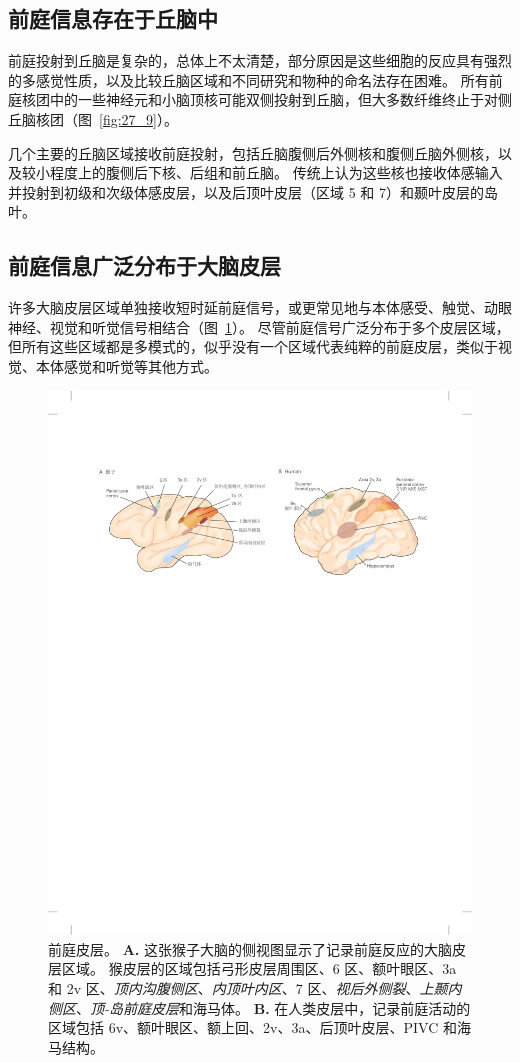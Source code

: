 \subsection{前庭信息存在于丘脑中}

前庭投射到丘脑是复杂的，总体上不太清楚，部分原因是这些细胞的反应具有强烈的多感觉性质，以及比较丘脑区域和不同研究和物种的命名法存在困难。
所有前庭核团中的一些神经元和小脑顶核可能双侧投射到丘脑，但大多数纤维终止于对侧丘脑核团（图~\ref{fig:27_9}）。


几个主要的丘脑区域接收前庭投射，包括丘脑腹侧后外侧核和腹侧丘脑外侧核，以及较小程度上的腹侧后下核、后组和前丘脑。
传统上认为这些核也接收体感输入并投射到初级和次级体感皮层，以及后顶叶皮层（区域 5 和 7）和颞叶皮层的岛叶。



\subsection{前庭信息广泛分布于大脑皮层}

许多大脑皮层区域单独接收短时延前庭信号，或更常见地与本体感受、触觉、动眼神经、视觉和听觉信号相结合（图~\ref{fig:27_14}）。 
尽管前庭信号广泛分布于多个皮层区域，但所有这些区域都是多模式的，似乎没有一个区域代表纯粹的前庭皮层，类似于视觉、本体感觉和听觉等其他方式。


\begin{figure}[htbp]
	\centering
	\includegraphics[width=0.9\linewidth]{chap27/fig_27_14}
	\caption{前庭皮层。
		\textbf{A.} 这张猴子大脑的侧视图显示了记录前庭反应的大脑皮层区域。
		猴皮层的区域包括弓形皮层周围区、6 区、额叶眼区、3a 和 2v 区、\textit{顶内沟腹侧区}、\textit{内顶叶内区}、7 区、\textit{视后外侧裂}、\textit{上颞内侧区}、\textit{顶-岛前庭皮层}和海马体。
		\textbf{B.} 在人类皮层中，记录前庭活动的区域包括 6v、额叶眼区、额上回、2v、3a、后顶叶皮层、PIVC 和海马结构。}
	\label{fig:27_14}
\end{figure}


